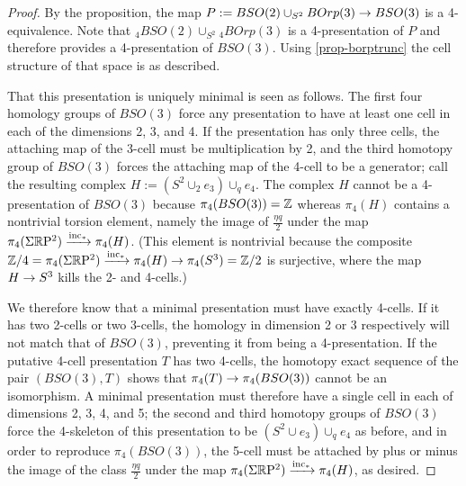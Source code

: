 \documentclass{amsart}
\begin{document}
\begin{proof}
By the proposition, the map $P := BSO(2) \cup_{S^2} BOrp(3) \rightarrow BSO(3)$ is a 4-equivalence.  Note that $_4 BSO(2) \cup_{S^2} {}_4 BOrp(3)$ is a 4-presentation of $P$ and therefore provides a 4-presentation of $BSO(3)$.  Using \cref{prop-borptrunc} the cell structure of that space is as described.  

That this presentation is uniquely minimal is seen as follows.  The first four homology groups of $BSO(3)$ force any presentation to have at least one cell in each of the dimensions 2, 3, and 4.  If the presentation has only three cells, the attaching map of the 3-cell must be multiplication by 2, and the third homotopy group of $BSO(3)$ forces the attaching map of the 4-cell to be a generator; call the resulting complex $H := (S^2 \cup_2 e_3) \cup_q e_4$.  The complex $H$ cannot be a 4-presentation of $BSO(3)$ because $\pi_4(BSO(3)) = \mathbb Z$ whereas $\pi_4(H)$ contains a nontrivial torsion element, namely the image of $\frac{\eta q}{2}$ under the map $\pi_4(\Sigma \mathbb R \mathrm{P}^2) \xrightarrow{\mathrm{inc}_*} \pi_4(H)$.  (This element is nontrivial because the composite $\mathbb Z/4 = \pi_4(\Sigma \mathbb R \mathrm{P}^2) \xrightarrow{\mathrm{inc}_*} \pi_4(H) \rightarrow \pi_4(S^3) = \mathbb Z/2$ is surjective, where the map $H \rightarrow S^3$ kills the 2- and 4-cells.) 

We therefore know that a minimal presentation must have exactly 4-cells.  If it has two 2-cells or two 3-cells, the homology in dimension 2 or 3 respectively will not match that of $BSO(3)$, preventing it from being a 4-presentation.  If the putative 4-cell presentation $T$ has two 4-cells, the homotopy exact sequence of the pair $(BSO(3), T)$ shows that $\pi_4(T) \rightarrow \pi_4(BSO(3))$ cannot be an isomorphism.  A minimal presentation must therefore have a single cell in each of dimensions 2, 3, 4, and 5; the second and third homotopy groups of $BSO(3)$ force the 4-skeleton of this presentation to be $(S^2 \cup e_3) \cup_q e_4$ as before, and in order to reproduce $\pi_4(BSO(3))$, the 5-cell must be attached by plus or minus the image of the class $\frac{\eta q}{2}$ under the map $\pi_4(\Sigma \mathbb R \mathrm{P}^2) \xrightarrow{\mathrm{inc}_*} \pi_4(H)$, as desired.  %
\end{proof}
\end{document}
